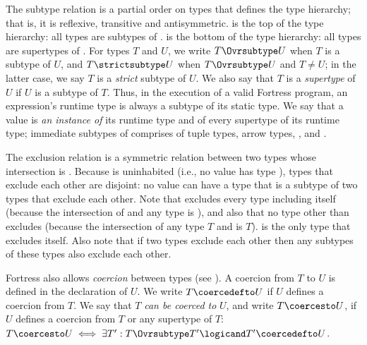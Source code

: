 The subtype relation is a partial order on types
that defines the type hierarchy;
that is,
it is reflexive, transitive and antisymmetric.
 is the top of the type hierarchy:
all types are subtypes of .
 is the bottom of the type hierarchy:
all types are supertypes of .
For types $T$ and $U$,
we write $T \Ovrsubtype U$ when $T$ is a subtype of $U$,
and $T \strictsubtype U$ when $T \Ovrsubtype U$ and $T \neq U$;
in the latter case,
we say $T$ is a \emph{strict} subtype of $U$.
We also say that $T$ is a \emph{supertype} of $U$ if $U$ is a subtype of $T$.
Thus, in the execution of a
valid Fortress program, an expression's runtime type is always a subtype of
its static type.
We say that a value is \emph{an instance of} its runtime
type and of every supertype of its runtime type; immediate subtypes of
 comprises of tuple types, arrow types, \TYP{()}, and .

The exclusion relation is a symmetric relation between two types
whose intersection is .
Because  is uninhabited
(i.e., no value has type ),
types that exclude each other are disjoint:
no value can have a type that is a subtype of two types that exclude each other.
Note that  excludes every type including itself
(because the intersection of  and any type is ),
and also that no type other than  excludes 
(because the intersection of any type $T$ and  is $T$).
 is the only type that excludes itself.
Also note that if two types exclude each other
then any subtypes of these types also exclude each other.


Fortress also allows \emph{coercion} between types
(see ).  A coercion from $T$ to $U$
is defined in the declaration of $U$.  We write $T \coercedefto U$ if
$U$ defines a coercion from $T$.  We say that $T$ \emph{can be coerced
to} $U$, and write $T \coercesto U$, if $U$ defines a coercion from
$T$ or any supertype of $T$: $T \coercesto U \iff \exists T':
T \Ovrsubtype T' \logicand T' \coercedefto U$.


